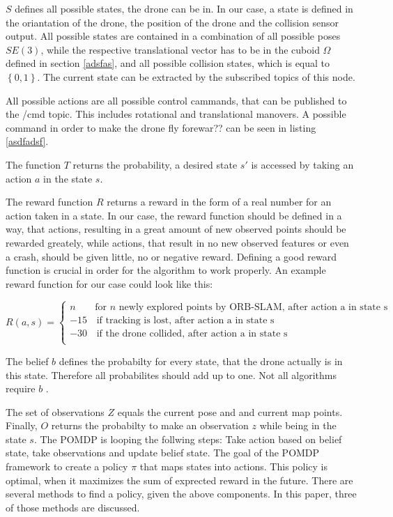 	$S$ defines all possible states, the drone can be in. In our case, a state is defined in the oriantation of the drone, the position of the drone and the collision sensor output.
	All possible states are contained in a combination of all possible poses $SE(3)$, while the respective translational vector has to be in the cuboid $\Omega$ defined in section \ref{adsfas},  
	and all possible collision states, which is equal to $\left\{0,1\right\}$. The current state can be extracted by the subscribed topics of this node. 
	
	All possible actions are all possible control cammands, that can be published to the /cmd topic. This includes rotational and translational manovers. A possible 
	command in order to make the drone fly forewar?? can be seen in listing \ref{asdfadsf}. 
	
	The function $T$ returns the probability, a desired state $s'$ is accessed by taking an action $a$ in the state $s$. 
	
	The reward function $R$ returns a reward in the form of a real number for an action taken in a state. In our case, the reward function should be defined in a way, that actions, resulting 
	in a great amount of new observed points should be rewarded greately, while actions, that result in no new observed features or even a crash, should be given little, no or negative reward. 
	Defining a good reward function is crucial in order for the algorithm to work properly. An example reward function for our case could look like this: 
	
	$$R(a,s) = \left\{
\begin{array}{ll}
n & \textrm{for } n \textrm{ newly explored points by ORB-SLAM,\ after action a in state s} \\
-15 & \, \textrm{if tracking is lost, after action a in state s}  \\
-30 & \, \textrm{if the drone collided, after action a in state s}  \\
\end{array}
\right. $$
	
	The belief $b$ defines the probabilty for every state, that the drone actually is in this state. Therefore all probabilites should add up to one. Not all algorithms 
	require $b$ \cite{belief}.
	
	The set of observations $Z$ equals the current pose and and current map points. Finally, $O$ returns the probabilty to make an observation $z$ while being in the state $s$.
	The POMDP is looping the follwing steps: Take action based on belief state, take observations and update belief state. The goal of the POMDP framework to 
	create a policy $\pi$ that maps states into actions. This policy is optimal, when it maximizes the sum of exprected reward in the future. There are several 
	methods to find a policy, given the above components. In this paper, three of those methods are discussed. 
	

